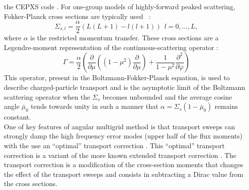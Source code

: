 \documentclass[preprint,10pt]{elsarticle}
\renewcommand{\(}{\left(}
\renewcommand{\)}{\right)}
\renewcommand{\[}{\left[}
\renewcommand{\]}{\right]}
\begin{document}
the CEPXS code \cite{cepxs}. For one-group models of highly-forward peaked scattering, Fokker-Planck cross sections 
are typically used \hbox{\cite{multigrid_1d,multigrid_2d,morel_81,morel_96} :}
%
\begin{equation}
\Sigma_{s,l}=\frac{\alpha}{2} (L(L+1)-l(l+1))\ \ l=0,\hdots,L ,
\end{equation}
%
where $\alpha$ is the restricted momentum transfer.
These cross sections are a Legendre-moment representation of the
continuous-scattering operator \cite{morel_96} :
%
\begin{equation}
\Gamma = \frac{\alpha}{2} \(\frac{\partial }{\partial \mu}\((1-\mu^2)\frac{\partial
}{\partial \mu}\)+\frac{1}{1-\mu^2}\frac{\partial^2}{\partial \varphi}\)
\end{equation}
%
This operator, present in the Boltzmann-Fokker-Planck equation, is used to describe
charged-particle transport \cite{morel_81,morel_96} and is the asymptotic 
limit of the  Boltzmann scattering operator when the $\Sigma_s$ becomes 
unbounded and the average cosine angle $\bar{\mu}_0$ tends towards unity in 
such a manner that $\alpha = \Sigma_s(1-\bar{\mu}_0)$ remains constant.\\

One of key features of angular multigrid method is that transport sweeps
can strongly damp the high frequency error modes (upper half of the flux moments) with the
use an ``optimal'' transport correction \cite{multigrid_1d}. 
This ``optimal'' transport correction is a variant of the
more known extended transport correction \cite{lathrop,morel_79}. The transport
correction is a modification of the cross-section moments that changes the effect
of the transport sweeps and consists in subtracting a Dirac value from the cross
sections. 
\end{document}
